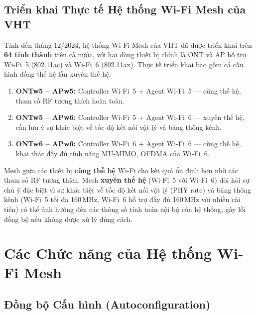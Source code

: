 \subsection{Triển khai Thực tế Hệ thống Wi-Fi Mesh của VHT}

Tính đến tháng 12/2024, hệ thống Wi-Fi Mesh của VHT đã được triển khai trên
\textbf{64 tỉnh thành} trên cả nước, với hai dòng thiết bị chính là ONT và AP hỗ trợ
Wi-Fi~5 (802.11ac) và Wi-Fi~6 (802.11ax). Thực tế triển khai bao gồm cả cấu hình
đồng thế hệ lẫn xuyên thế hệ:

\begin{enumerate}
	\item \textbf{ONTw5 -- APw5:} Controller Wi-Fi~5 + Agent Wi-Fi~5 --- cùng thế hệ,
	tham số RF tương thích hoàn toàn.
	\item \textbf{ONTw5 -- APw6:} Controller Wi-Fi~5 + Agent Wi-Fi~6 --- xuyên thế hệ,
	cần lưu ý sự khác biệt về tốc độ kết nối vật lý và băng thông kênh.
	\item \textbf{ONTw6 -- APw6:} Controller Wi-Fi~6 + Agent Wi-Fi~6 --- cùng thế hệ,
	khai thác đầy đủ tính năng MU-MIMO, OFDMA của Wi-Fi~6.
\end{enumerate}

Mesh giữa các thiết bị \textbf{cùng thế hệ} Wi-Fi cho kết quả ổn định hơn nhờ các
tham số RF tương thích. Mesh \textbf{xuyên thế hệ} (Wi-Fi~5 với Wi-Fi~6) đòi hỏi sự
chú ý đặc biệt vì sự khác biệt về tốc độ kết nối vật lý (PHY rate) và băng thông kênh
(Wi-Fi~5 tối đa 160\,MHz, Wi-Fi~6 hỗ trợ đầy đủ 160\,MHz với nhiều cải tiến) có thể
ảnh hưởng đến các thông số tính toán nội bộ của hệ thống, gây lỗi đồng bộ nếu không
được xử lý đúng cách.


\section{Các Chức năng của Hệ thống Wi-Fi Mesh}

\subsection{Đồng bộ Cấu hình (Autoconfiguration)}


